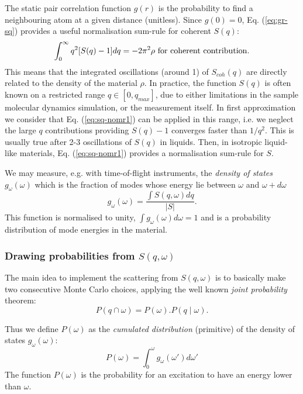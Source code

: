 The static pair correlation function $g(r)$ is the probability to find a neighbouring atom at a given distance (unitless). Since $g(0) = 0$, Eq. (\ref{eq:gr-sq}) provides a useful normalisation sum-rule for coherent $S(q)$:
\begin{equation}
\label{eq:sq-nomr1}
\int_0^\infty q^2 [S(q) - 1] dq = -2\pi^2\rho {\rm\ for\ coherent\ contribution.}
\end{equation}
This means that the integrated oscillations (around 1) of $S_{coh}(q)$ are directly related to the density of the material $\rho$.
In practice, the function $S(q)$ is often known on a restricted range $q \in [0, q_{max} ]$, due to either limitations in the sample molecular dynamics simulation, or the measurement itself.
In first approximation we consider that Eq. (\ref{eq:sq-nomr1}) can be applied in this range, i.e. we neglect the large $q$ contributions providing $S(q)-1$ converges faster than $1/q^2$. This is usually true after 2-3 oscillations of $S(q)$ in liquids.
Then, in isotropic liquid-like materials, Eq. (\ref{eq:sq-nomr1}) provides a normalisation sum-rule for $S$.

We may measure, e.g. with time-of-flight instruments, the \emph{density of states} $g_{\omega}(\omega)$  which is the fraction of modes whose energy lie between $\omega$ and $\omega+d\omega$ \cite{lovesey84}
\begin{equation}
g_{\omega}(\omega) = \frac{\int S(q,\omega) dq}{|S|} .
\end{equation}
This function is normalised to unity, $\int g_{\omega}(\omega) d\omega = 1$ and is a probability distribution of mode energies in the material.

\subsubsection{Drawing probabilities from $S(q, \omega)$}

The main idea to implement the scattering from $S(q, \omega)$ is to basically make two consecutive Monte Carlo choices, applying the well known \emph{joint probability} theorem:
\begin{equation}
\label{eq:jointproba}
P(q \cap \omega) = P(\omega).P(q \mid \omega) .
\end{equation}

Thus we define $P(\omega)$ as the \emph{cumulated distribution} (primitive) of the density of states $g_{\omega}(\omega)$:
\begin{equation}\label{eq:Pw}
P(\omega) = \int_0^\omega g_{\omega}(\omega') d\omega'
\end{equation}
The function $P(\omega)$ is the probability for an excitation to have an energy lower than $\omega$.


